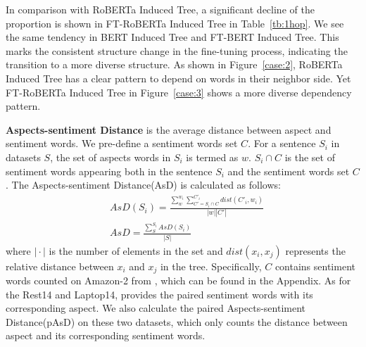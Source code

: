 \documentclass[11pt]{article}
\begin{document}
In comparison with RoBERTa Induced Tree, a significant decline of the proportion is shown in FT-RoBERTa Induced Tree  in Table~\ref{tb:1hop}. We see the same tendency in BERT Induced Tree and FT-BERT Induced Tree.  This marks the consistent structure change in the fine-tuning process, indicating the transition to a more diverse structure. As shown in Figure~\ref{case:2}, RoBERTa Induced Tree  has a clear pattern to depend on words in their neighbor side. Yet FT-RoBERTa Induced Tree in Figure~\ref{case:3} shows a more diverse dependency pattern.



\textbf{Aspects-sentiment Distance} is the average distance between aspect and sentiment words. We pre-define a sentiment words set $C$. For a sentence $S_i$ in datasets $S$,  the set of aspects words in $S_i$ is termed as $w$. $S_{i} \cap C $ is the set of sentiment words appearing both in the sentence $S_{i}$ and the sentiment words set $C $. The Aspects-sentiment Distance(AsD) is calculated as follows:
\begin{align}
   & AsD({S_i}) = \frac{\sum\limits^{w_i}_w\sum\limits^{C'_i}_{C'=S_{i} \cap C }dist(C'_i, w_i)}{\left|w\right| | C'|} \\
   & AsD = \frac{\sum\limits^{S_i}_S AsD({S_i})}{|S|}
\end{align}
where $\!|\!\cdot\!|$ is the number of elements in the set and $dist(x_i,x_j)$ represents the relative distance between $x_i$ and $x_j$ in the tree. Specifically,  $C$ contains sentiment words counted on Amazon-2 from \citet{DBLP:conf/acl/TianGXLHWWW20}, which can be found in the Appendix. As for the Rest14 and Laptop14, \citet{dblp:conf/emnlp/xullb20} provides the paired sentiment words with its corresponding aspect. We also calculate the paired Aspects-sentiment Distance(pAsD) on these two datasets, which only counts the distance between aspect and its corresponding sentiment words.
\end{document}
